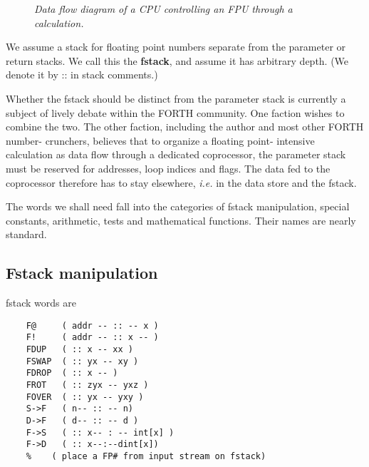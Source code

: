 \begin{figure}[H]
    \caption{\textit{Data flow diagram of a CPU controlling an FPU through a calculation.}}
    \label{fig:03_01}
\end{figure}

We assume a stack for floating point numbers separate from the 
parameter or return stacks. We call this the \textbf{fstack}, and assume it
has arbitrary depth. (We denote it by :: in stack comments.)

\leftbar[1\linewidth] \noindent
Whether the fstack should be distinct from the parameter stack
is currently a subject of lively debate within the FORTH community. 
One faction wishes to combine the two. The other
faction, including the author and most other FORTH number-
crunchers, believes that to organize a floating point- intensive
calculation as data flow through a dedicated coprocessor, the
parameter stack must be reserved for addresses, loop indices and
flags. The data fed to the coprocessor therefore has to stay
elsewhere, \textit{i.e.} in the data store and the fstack.
\endleftbar

The words we shall need fall into the categories of fstack 
manipulation, special constants, arithmetic, tests and mathematical functions.
Their names are nearly standard.

\subsection{Fstack manipulation}
 fstack words are
\begin{lstlisting}
    F@     ( addr -- :: -- x )
    F!     ( addr -- :: x -- )
    FDUP   ( :: x -- xx )
    FSWAP  ( :: yx -- xy )
    FDROP  ( :: x -- )
    FROT   ( :: zyx -- yxz )
    FOVER  ( :: yx -- yxy )
    S->F   ( n-- :: -- n)
    D->F   ( d-- :: -- d )
    F->S   ( :: x-- : -- int[x] )
    F->D   ( :: x--:--dint[x])
    %    ( place a FP# from input stream on fstack)
\end{lstlisting}
 
